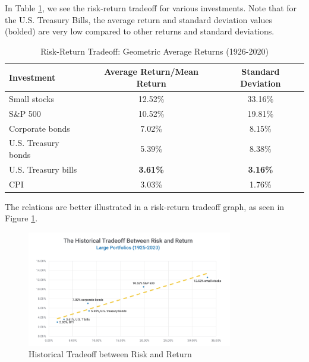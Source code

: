 In Table \ref{tab:risk_return_tradeoff}, we see the risk-return tradeoff for various investments. Note that for the U.S. Treasury Bills, the average return and standard deviation values (bolded) are very low compared to other returns and standard deviations. 
\begin{table}[ht]
    \centering
    \caption{Risk-Return Tradeoff: Geometric Average Returns (1926-2020)}
    \label{tab:risk_return_tradeoff}
    \begin{tabular}{@{}lcc@{}}
    \toprule
    \textbf{Investment} & \textbf{Average Return/Mean Return} & \textbf{Standard Deviation} \\ \midrule
    Small stocks        & 12.52\%                 & 33.16\%                    \\
    S\&P 500            & 10.52\%                 & 19.81\%                    \\
    Corporate bonds     & 7.02\%                  & 8.15\%                     \\
    U.S. Treasury bonds & 5.39\%                  & 8.38\%                     \\
    U.S. Treasury bills & \textbf{3.61\% }        &\textbf{ 3.16\% }           \\
    CPI                 & 3.03\%                  & 1.76\%                     \\ \bottomrule
    \end{tabular}
\end{table}

The relations are better illustrated in a risk-return tradeoff graph, as seen in Figure \ref{fig:risk_return}.

\begin{figure}[H]
    \centering
    \includegraphics[width=0.8\textwidth]{img/5.4.png}
    \caption{Historical Tradeoff between Risk and Return}
    \label{fig:risk_return}
\end{figure}

